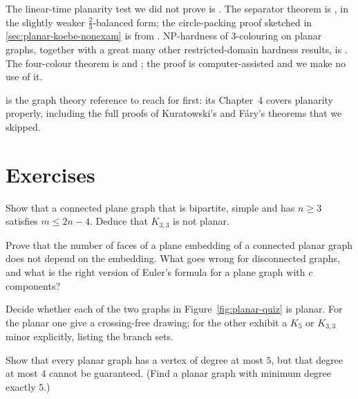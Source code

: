 The linear-time planarity test we did not prove is \citet{HopcroftTarjan1974}.
The separator theorem is \citet{LiptonTarjan1979}, in the slightly weaker
$\tfrac{2}{3}$-balanced form; the circle-packing proof sketched in
\cref{sec:planar-koebe-nonexam} is from
\citet{MillerTengThurstonVavasis1997}. NP-hardness of $3$-colouring on planar
graphs, together with a great many other restricted-domain hardness results, is
\citet{GareyJohnsonStockmeyer1976}. The four-colour theorem is
\citet{AppelHaken1977} and \citet{AppelHakenKoch1977}; the proof is
computer-assisted and we make no use of it.

\citet{Diestel2017} is the graph theory reference to reach for first: its
Chapter~4 covers planarity properly, including the full proofs of Kuratowski's
and F\'ary's theorems that we skipped.

\section{Exercises}

\begin{exercise}
Show that a connected plane graph that is bipartite, simple and has $n \ge 3$
satisfies $m \le 2n - 4$. Deduce that $K_{3,3}$ is not planar.
\end{exercise}

\begin{exercise}
Prove that the number of faces of a plane embedding of a connected planar graph
does not depend on the embedding. What goes wrong for disconnected graphs, and
what is the right version of Euler's formula for a plane graph with $c$
components?
\end{exercise}

\begin{exercise}
Decide whether each of the two graphs in Figure~\ref{fig:planar-quiz} is planar. For
the planar one give a crossing-free drawing; for the other exhibit a $K_5$ or
$K_{3,3}$ minor explicitly, listing the branch sets.
\end{exercise}

\begin{exercise}
Show that every planar graph has a vertex of degree at most $5$, but that
degree at most $4$ cannot be guaranteed. (Find a planar graph with minimum
degree exactly $5$.)
\end{exercise}

